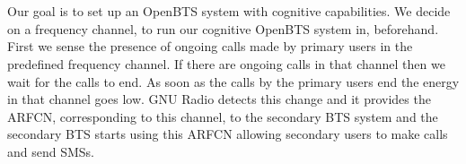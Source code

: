 \chapter*{}
Our goal is to set up an OpenBTS system with cognitive capabilities. We decide on a frequency channel, to run our cognitive OpenBTS system in, beforehand. First we sense the presence of ongoing calls made by primary users in the predefined frequency channel. If there are ongoing calls in that channel then we wait for the calls to end. As soon as the calls by the primary users end the energy in that channel goes low. GNU Radio detects this change and it provides the ARFCN, corresponding to this channel, to the secondary BTS system and the secondary BTS starts using this ARFCN allowing secondary users to make calls and send SMSs.
